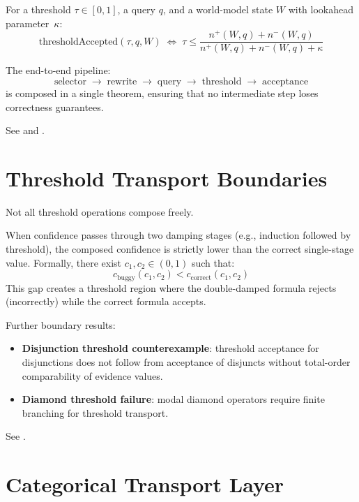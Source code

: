 \documentclass[11pt,openany]{report}
\begin{document}
\begin{definition}
For a threshold $\tau \in [0,1]$, a query $q$, and a world-model state $W$
with lookahead parameter~$\kappa$:
\[
  \mathrm{thresholdAccepted}(\tau, q, W) \;\iff\;
  \tau \le \frac{n^+(W, q) + n^-(W, q)}{n^+(W, q) + n^-(W, q) + \kappa}
\]
\end{definition}

The end-to-end pipeline:
\[
  \text{selector} \;\to\; \text{rewrite} \;\to\; \text{query} \;\to\;
  \text{threshold} \;\to\; \text{acceptance}
\]
is composed in a single theorem, ensuring that no intermediate step
loses correctness guarantees.

See 
and .

\section{Threshold Transport Boundaries}

Not all threshold operations compose freely.

\begin{theorem}
When confidence passes through two damping stages (e.g., induction
followed by threshold), the composed confidence is strictly lower than
the correct single-stage value.  Formally, there exist
$c_1, c_2 \in (0,1)$ such that:
\[
  c_{\mathrm{buggy}}(c_1, c_2) < c_{\mathrm{correct}}(c_1, c_2)
\]
This gap creates a threshold region where the double-damped formula
rejects (incorrectly) while the correct formula accepts.
\end{theorem}

Further boundary results:
\begin{itemize}
\item \textbf{Disjunction threshold counterexample}: threshold acceptance
  for disjunctions does not follow from acceptance of disjuncts without
  total-order comparability of evidence values.
\item \textbf{Diamond threshold failure}: modal diamond operators require
  finite branching for threshold transport.
\end{itemize}

See .

\section{Categorical Transport Layer}
\end{document}
